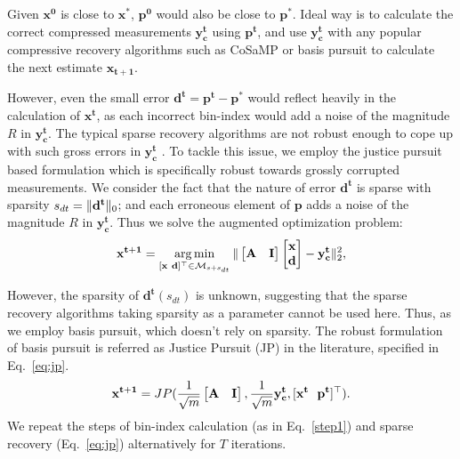 Given $\mathbf{x^0}$ is close to $\mathbf{x^*}$, $\mathbf{p^0}$ would also be close to $\mathbf{p^*}$. Ideal way is to calculate the correct compressed measurements $\mathbf{y^t_c}$ using $\mathbf{p^t}$, and use $\mathbf{y^t_c}$ with any popular compressive recovery algorithms such as CoSaMP or basis pursuit to calculate the next estimate $\mathbf{{x}_{t+1}}$. 

However, even the small error $\mathbf{d^t} = \mathbf{p^t - p^*}$ would reflect heavily in the calculation of $\mathbf{x^t}$, as each incorrect bin-index would add a noise of the magnitude $R$ in $\mathbf{y^t_c}$. The typical sparse recovery algorithms are not robust enough to cope up with such gross errors in $\mathbf{y^t_c}$ \cite{Laska2009}. To tackle this issue, we employ the justice pursuit based formulation which is specifically robust towards grossly corrupted measurements. We consider the fact that the nature of error $\mathbf{d^t}$ is sparse with sparsity $s_{dt}=\|\mathbf{d^t}\|_0$; and each erroneous element of $\mathbf{p}$ adds a noise of the magnitude $R$ in $\mathbf{y^t_c}$. Thus we solve the augmented optimization problem:
$$
\mathbf{{x}^{t+1}}=\argmin_{[\mathbf{x~d}]^\t \in \mathcal{M}_{s+s_{dt}}}\norm{\begin{bmatrix} \mathbf{A} & \mathbf{I} \end{bmatrix} \begin{bmatrix} \mathbf{x} \\ \mathbf{d} \end{bmatrix} - \mathbf{y^t_c}}_2^2, %
$$

However, the sparsity of $\mathbf{d^t}(s_{dt})$ is unknown, suggesting that the sparse recovery algorithms taking sparsity as a parameter cannot be used here. Thus, as we employ basis pursuit, which doesn't rely on sparsity. The robust formulation of basis pursuit is referred as Justice Pursuit (JP) \cite{Laska2009} in the literature, specified in Eq.~\ref{eq:jp}.
\begin{equation}
\mathbf{{x^{t+1}}} = JP(\frac{1}{\sqrt{m}}\begin{bmatrix} \mathbf{A} & \mathbf{I} \end{bmatrix},\frac{1}{\sqrt{m}}\mathbf{y^t_c},[\mathbf{x^t~~p^t}]^\top).
\label{eq:jp}
\end{equation}
We repeat the steps of bin-index calculation (as in Eq.~\ref{step1}) and sparse recovery (Eq.~\ref{eq:jp}) alternatively for $T$ iterations.%

